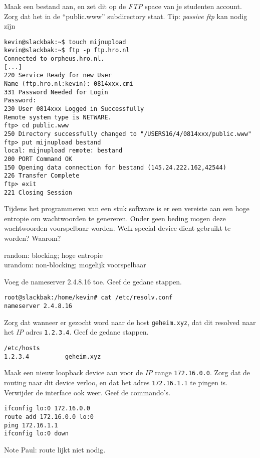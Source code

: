 \question[10] Maak een bestand aan, en zet dit op de \emph{FTP} space van je studenten account. Zorg dat het in de ``public.www'' subdirectory staat. Tip: \emph{passive ftp} kan nodig zijn
\begin{solution}
\begin{lstlisting}
kevin@slackbak:~$ touch mijnupload
kevin@slackbak:~$ ftp -p ftp.hro.nl
Connected to orpheus.hro.nl.
[...]
220 Service Ready for new User
Name (ftp.hro.nl:kevin): 0814xxx.cmi
331 Password Needed for Login
Password:
230 User 0814xxx Logged in Successfully
Remote system type is NETWARE.
ftp> cd public.www
250 Directory successfully changed to "/USERS16/4/0814xxx/public.www"
ftp> put mijnupload bestand
local: mijnupload remote: bestand
200 PORT Command OK
150 Opening data connection for bestand (145.24.222.162,42544)
226 Transfer Complete
ftp> exit
221 Closing Session
\end{lstlisting}%
\end{solution}

\question[10] Tijdens het programmeren van een stuk software is er een vereiste aan een hoge entropie om wachtwoorden te genereren. Onder geen beding mogen deze wachtwoorden voorspelbaar worden. Welk special device dient gebruikt te worden? Waarom?
\begin{solution}
random: blocking; hoge entropie\\
urandom: non-blocking; mogelijk voorspelbaar
\end{solution}

\question[10] Voeg de nameserver 2.4.8.16 toe. Geef de gedane stappen. 
\begin{solution}
\begin{lstlisting}
root@slackbak:/home/kevin# cat /etc/resolv.conf 
nameserver 2.4.8.16
\end{lstlisting}
\end{solution}

\question[10] Zorg dat wanneer er gezocht word naar de host \texttt{geheim.xyz}, dat dit resolved naar het \emph{IP} adres \texttt{1.2.3.4}. Geef de gedane stappen. 
\begin{solution}
\begin{lstlisting}
/etc/hosts
1.2.3.4          geheim.xyz
\end{lstlisting}
\end{solution}

\question[10] Maak een nieuw loopback device aan voor de \emph{IP} range \texttt{172.16.0.0}. Zorg dat de routing naar dit device verloo, en dat het adres \texttt{172.16.1.1} te pingen is. Verwijder de interface ook weer. Geef de commando's.
\begin{solution}
\begin{lstlisting}
ifconfig lo:0 172.16.0.0
route add 172.16.0.0 lo:0
ping 172.16.1.1
ifconfig lo:0 down
\end{lstlisting}
Note Paul: route lijkt niet nodig.
\end{solution}

